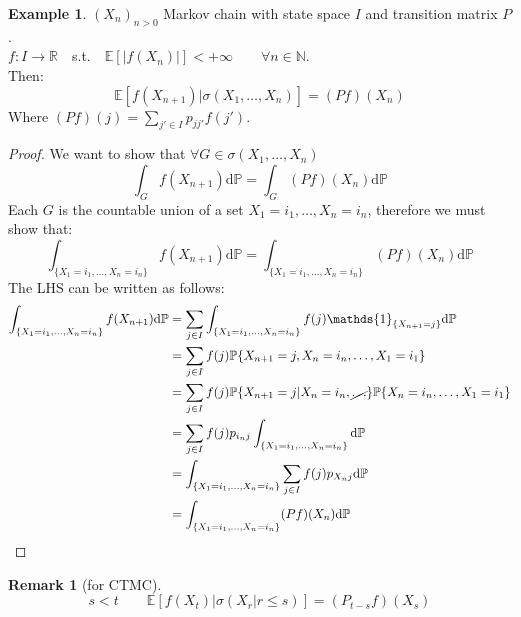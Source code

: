 \documentclass[10pt,a4paper]{article}
\theoremstyle{definition}
\newtheorem{exi}{Example}[section]
\newtheorem*{rem}{Remark}
\newcommand{\ind}{\mathds{1}}
\begin{document}
\begin{exi}
	$(X_n)_{n>0}$ Markov chain with state space $I$ and transition matrix $P$.\\
	$f:I\to\mathbb{R} \quad$s.t.$\quad\mathbb{E}[|f(X_n)|]<+\infty \qquad \forall n\in\mathbb{N}$.\\ Then:
	\begin{equation*}
		\mathbb{E}[f(X_{n+1})|\sigma(X_1,\ldots,X_n)]=(Pf)(X_n)
	\end{equation*}
Where $(Pf)(j)=\sum_{j'\in I}p_{jj'}f(j')$.
\begin{proof}
	We want to show that $\forall G \in \sigma(X_1,\ldots,X_n)$
	\begin{equation*}
		\int_{G}f(X_{n+1})\mathrm{d}\mathbb{P}=\int_{G}(Pf)(X_n)\mathrm{d}\mathbb{P}
	\end{equation*}
Each $G$ is the countable union of a set ${X_1=i_1,\ldots,X_n=i_n}$, therefore we must show that:
\begin{equation*}
	\int_{\{X_1=i_1,\ldots,X_n=i_n\}}f(X_{n+1})\mathrm{d}\mathbb{P}=\int_{\{X_1=i_1,\ldots,X_n=i_n\}}(Pf)(X_n)\mathrm{d}\mathbb{P}
\end{equation*}
The LHS can be written as follows:
\begin{equation*}
	\begin{split}
		\int_{\{X_1=i_1,\ldots,X_n=i_n\}}f(X_{n+1})\mathrm{d}\mathbb{P}&=\sum_{j\in I}\int_{\{X_1=i_1,\ldots,X_n=i_n\}}f(j)\ind_{\{X_{n+1}=j\}}\mathrm{d}\mathbb{P} \\
		&=\sum_{j\in I}f(j)\mathbb{P}\{X_{n+1}=j,X_n=i_n,\ldots,X_1=i_1\}\\
		&=\sum_{j\in I}f(j)\mathbb{P}\{X_{n+1}=j|X_n=i_n,\cancel{\ldots}\}\mathbb{P}\{X_n=i_n,\ldots,X_1=i_1\} \\
		&=\sum_{j\in I}f(j)p_{i_n j}\int_{\{X_1=i_1,\ldots,X_n=i_n\}}\mathrm{d}\mathbb{P} \\
		&=\int_{\{X_1=i_1,\ldots,X_n=i_n\}}\sum_{j\in I}f(j)p_{X_n j}\mathrm{d}\mathbb{P} \\
		&=\int_{\{X_1=i_1,\ldots,X_n=i_n\}}(Pf)(X_n)\mathrm{d}\mathbb{P}
	\end{split}
\end{equation*}
\end{proof}
\end{exi}
\begin{rem}[for CTMC]
	\begin{equation*}
		s<t \qquad \mathbb{E}[f(X_t)|\sigma(X_r|r\leq s)]=(P_{t-s}f)(X_s)
	\end{equation*}
\end{rem}
\end{document}
